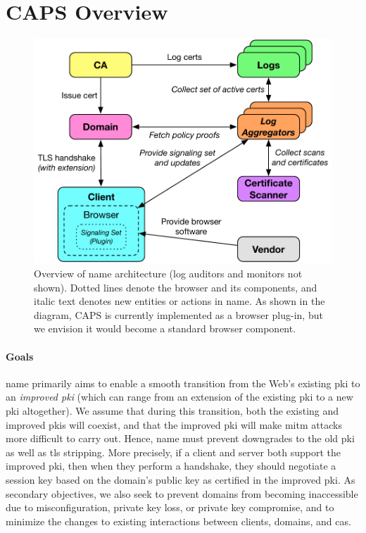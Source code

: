 \section{CAPS Overview}
\label{sec:design:overview}

\begin{figure}
  \centering
  \includegraphics[width=.9\linewidth]{fig/arch}
  \vspace{-3mm}
  \caption{Overview of \ac{name} architecture (log auditors and monitors not
  shown). Dotted lines denote the browser and its components, and italic text
denotes new entities or actions in \ac{name}.  As shown in the diagram,
CAPS is currently implemented as a browser plug-in, but we envision it
would become a standard browser component.
  }
  \vspace{-3mm}
  \label{fig:overview}
\end{figure}

\paragraph{Goals}
\ac{name} primarily aims to enable a smooth transition from the Web's existing
\ac{pki} to an \emph{improved \ac{pki}} (which can range from an extension of
the existing \ac{pki} to a new \ac{pki} altogether). We assume that during this
transition, both the existing and improved \acp{pki} will coexist, and that the
improved \ac{pki} will make \ac{mitm} attacks more difficult to carry out.
Hence, \ac{name} must prevent downgrades to the old \ac{pki} as well as \ac{tls}
stripping. More precisely, if a client and server both support the improved
\ac{pki}, then when they perform a handshake, they should negotiate a session
key based on the domain's public key as certified in the improved \ac{pki}. As
secondary objectives, we also seek to prevent domains from becoming inaccessible
due to misconfiguration, private key loss, or private key compromise, and to
minimize the changes to existing interactions between clients, domains, and
\acp{ca}.


